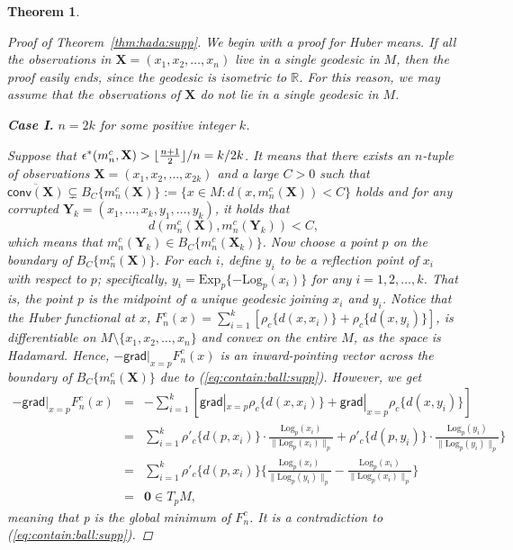 \documentclass[preprint]{imsart}
\DeclarePairedDelimiter\floor{\lfloor}{\rfloor}
\theoremstyle{plain}
\newtheorem{theorem}{Theorem}
\theoremstyle{remark}
\begin{document}
\begin{appendix}
\begin{theorem}
\begin{proof}[Proof of Theorem~\ref{thm:hada:supp}]
We begin with a proof for Huber means. If all the observations in $\mathbf{X}=(x_1,x_2,\ldots, x_{n})$ live in a single geodesic in $M$, then the proof easily ends, since the geodesic is isometric to $\mathbb{R}$. For this reason, we may assume that the observations of $\mathbf{X}$ do not lie in a single geodesic in $M$.

\textbf{Case I.} $n=2k$ for some positive integer $k$.

Suppose that $\epsilon^{*}(m^{c}_{n},\mathbf{X}) > \floor{\frac{n+1}{2}}/n = k/2k$. It means that there exists an $n$-tuple of observations $\textbf{X} = (x_1, x_2, \ldots, x_{2k})$ and a large $C>0$ such that $\overline{\textsf{conv}(\mathbf{X})} \subsetneq B_{C}\{m^{c}_{n}(\textbf{X})\}:= \{x\in M : d(x, m^{c}_{n}(\textbf{X})) < C \}$ holds and for any corrupted $\textbf{Y}_{k}=(x_1, \ldots, x_k, y_1, \ldots, y_k)$, it holds that
\begin{equation}\label{eq:contain:ball:supp}
d(m^{c}_{n}(\textbf{X}), m^{c}_{n}(\mathbf{Y}_{k})) < C, 
\end{equation}
which means that $m^{c}_{n}(\mathbf{Y}_{k}) \in B_{C}\{m^{c}_{n}(\mathbf{X}_{k})\}$. Now choose a point $p$ on the boundary of $B_{C}\{m^{c}_{n}(\textbf{X})\}$. For each $i$, define $y_i$ to be a reflection point of $x_i$ with respect to $p$; specifically, $y_{i} = \mbox{Exp}_{p}\{-\mbox{Log}_{p}(x_i)\}$ for any $i=1, 2, \ldots, k$. That is, the point $p$ is the midpoint of a unique geodesic joining $x_i$ and $y_i$. Notice that the Huber functional at $x$, $F^{c}_{n}(x)= \sum_{i=1}^{k}[\rho_{c}\{d(x, x_i)\} + \rho_{c}\{d(x, y_i)\}]$, is differentiable on $M \setminus \{x_1, x_2, \ldots, x_n\}$ and convex on the entire $M$, as the space is Hadamard. Hence, $-\textsf{grad}|_{x=p}F^{c}_{n}(x)$ is an inward-pointing vector across the boundary of $B_{C}\{m^{c}_{n}(\textbf{X})\}$ due to (\ref{eq:contain:ball:supp}). However, we get
\begin{eqnarray*}
-\textsf{grad}|_{x=p}F^{c}_{n}(x) &=& -\sum_{i=1}^{k} [\textsf{grad}|_{x=p}\rho_{c}\{d(x, x_i)\} + \textsf{grad}|_{x=p}\rho_{c}\{d(x, y_i)\}] \\
&=& \sum_{i=1}^{k} \rho'_{c}\{d(p, x_i)\} \cdot \frac{\mbox{Log}_{p}(x_i)}{\| \mbox{Log}_{p}(x_i) \|_{p}} + \rho'_{c}\{d(p, y_i)\} \cdot \frac{\mbox{Log}_{p}(y_i)}{\| \mbox{Log}_{p}(y_i) \|_{p}}\} \\
&=& \sum_{i=1}^{k} \rho'_{c}\{d(p, x_i)\}\{\frac{\mbox{Log}_{p}(x_i)}{\| \mbox{Log}_{p}(y_i) \|_{p}} - \frac{\mbox{Log}_{p}(x_i)}{\| \mbox{Log}_{p}(x_i) \|_{p}} \} \\
&=& \textbf{0} \in T_{p}M,
\end{eqnarray*}
meaning that p is the global minimum of $F^{c}_{n}$. It is a contradiction to (\ref{eq:contain:ball:supp}). 


\end{proof}
\end{theorem}
\end{appendix}
\end{document}
